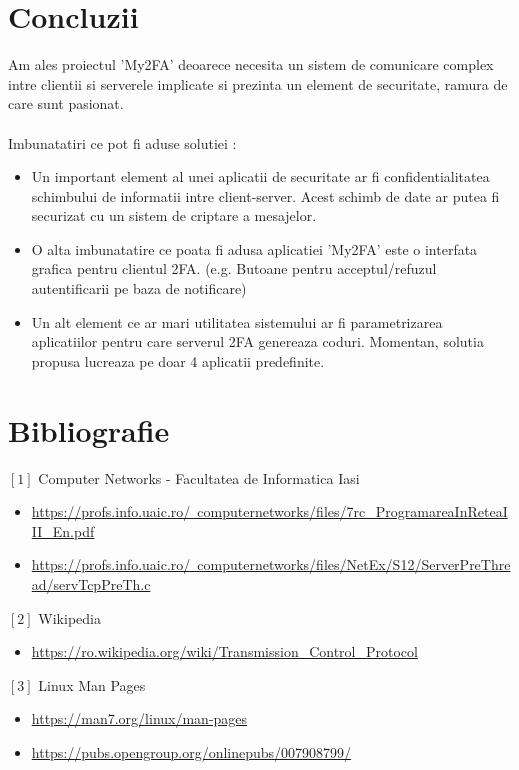 \documentclass{article}
\begin{document}
	 \section{Concluzii}	 
	 Am ales proiectul 'My2FA' deoarece necesita un sistem de comunicare complex intre clientii si serverele implicate si prezinta un element de securitate, ramura de care sunt pasionat.
	 \\ \\
	 Imbunatatiri ce pot fi aduse solutiei :
	 \begin{itemize}
	 	\item  Un important element al unei aplicatii de securitate ar fi confidentialitatea schimbului de informatii intre client-server. Acest schimb de date ar putea fi securizat cu un sistem de criptare a mesajelor.
	 	\item  O alta imbunatatire ce poata fi adusa aplicatiei 'My2FA' este o interfata grafica pentru clientul 2FA. (e.g. Butoane pentru acceptul/refuzul autentificarii pe baza de notificare)
	 	\item Un alt element ce ar mari utilitatea sistemului ar fi parametrizarea aplicatiilor pentru care serverul 2FA genereaza coduri. Momentan, solutia propusa lucreaza pe doar 4 aplicatii predefinite.
	 \end{itemize}
	 
	 
	 \section{Bibliografie}
	 $[1]$ Computer Networks - Facultatea de Informatica Iasi
	 \begin{itemize}
	 	\item \href{https://profs.info.uaic.ro/~computernetworks/files/7rc\_ProgramareaInReteaIII\_En.pdf}{https://profs.info.uaic.ro/~computernetworks/files/7rc\_ProgramareaInReteaIII\_En.pdf}
	 	\item 
	 	\href{https://profs.info.uaic.ro/~computernetworks/files/NetEx/S12/ServerPreThread/servTcpPreTh.c}{https://profs.info.uaic.ro/~computernetworks/files/NetEx/S12/ServerPreThread/servTcpPreTh.c}
	 \end{itemize}
 	 $[2]$ Wikipedia
 	 \begin{itemize}
 	 	\item \href{https://ro.wikipedia.org/wiki/Transmission\_Control\_Protocol}{https://ro.wikipedia.org/wiki/Transmission\_Control\_Protocol}
 	 \end{itemize}
  	 $[3]$ Linux Man Pages
	 \begin{itemize}
	 	\item 
	 	\href{https://man7.org/linux/man-pages}{https://man7.org/linux/man-pages}
	 	\item 
	 	\href{https://pubs.opengroup.org/onlinepubs/007908799/}{https://pubs.opengroup.org/onlinepubs/007908799/}
	 \end{itemize}
\end{document}

